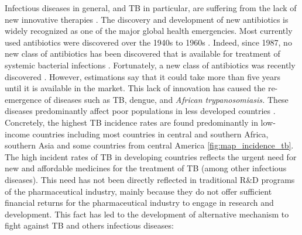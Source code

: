\documentclass[12pt, a4paper,twoside]{tesi_upf}
\begin{document}
\par Infectious diseases in general, and TB in particular, are suffering from the lack of new innovative therapies \cite{Trouiller2016}. The discovery and development of new antibiotics is widely recognized as one of the major global health emergencies. Most currently used antibiotics were discovered over the 1940s to 1960s \cite{Lewis2013}. Indeed, since 1987, no new class of antibiotics has been discovered that is available for treatment of systemic bacterial infections \cite{Conly2005}. Fortunately, a new class of antibiotics was recently discovered \cite{Ling2015a}. However, estimations say that it could take more than five years until it is available in the market. This lack of innovation has caused the re-emergence of diseases such  as  TB, dengue, and \textit{African trypanosomiasis.} These diseases predominantly  affect  poor  populations in less developed countries \cite{Trouiller2016}. Concretely, the highest TB incidence rates are found predominantly in low-income countries including most countries in central and southern Africa, southern Asia and some countries from central America \ref{fig:map_incidence_tb}. The high incident rates of TB in developing countries reflects the urgent need for new and affordable medicines for the treatment of TB (among other infectious diseases). This need has not been directly reflected in traditional R$\&$D programs of the pharmaceutical industry, mainly because they do not offer sufficient financial returns for the pharmaceutical industry  to engage in research and development. This fact has led to the development of alternative mechanism to fight against TB and others infectious diseases:
\end{document}
